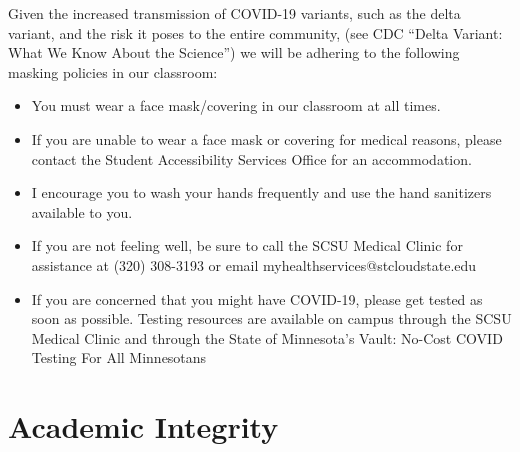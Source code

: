\documentclass{tufte-handout}
\begin{document}
\begin{fullwidth}

Given the increased transmission of COVID-19 variants, such as the delta variant, and the risk it poses to the entire community, (see CDC ``Delta Variant: What We Know About the Science'') we will be adhering to the following masking policies in our classroom:

\begin{itemize}
\item You must wear a face mask/covering in our classroom at all times. 
\item If you are unable to wear a face mask or covering for medical reasons,
please contact the Student Accessibility Services Office for an
accommodation. 
\item I encourage you to wash your hands frequently and use the hand
sanitizers available to you.
\item If you are not feeling well, be sure to call the SCSU Medical Clinic for
assistance at (320) 308-3193 or email
myhealthservices@stcloudstate.edu
\item If you are concerned that you might have COVID-19, please get tested as
soon as possible. Testing resources are available on campus through the
SCSU Medical Clinic and through the State of Minnesota’s Vault: No-Cost
COVID Testing For All Minnesotans
\end{itemize}


\section{Academic Integrity}





\end{fullwidth}
\end{document}
